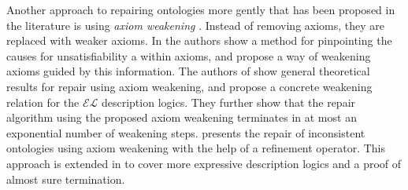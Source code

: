 Another approach to repairing ontologies more gently that has been proposed in the literature is using \emph{axiom weakening} \cite{troquard2018repairing,confalonieri2020towards,confalonieri2022irresistible,baader2018making,lam2008fine}. Instead of removing axioms, they are replaced with weaker axioms. In \cite{lam2008fine} the authors show a method for pinpointing the causes for unsatisfiability a within axioms, and propose a way of weakening axioms guided by this information. The authors of \cite{baader2018making} show general theoretical results for repair using axiom weakening, and propose a concrete weakening relation for the $\mathcal{EL}$ description logics. They further show that the repair algorithm using the proposed axiom weakening terminates in at most an exponential number of weakening steps. \cite{troquard2018repairing} presents the repair of inconsistent ontologies using axiom weakening with the help of a refinement operator. This approach is extended in \cite{confalonieri2020towards,confalonieri2022irresistible} to cover more expressive description logics and a proof of almost sure termination.
